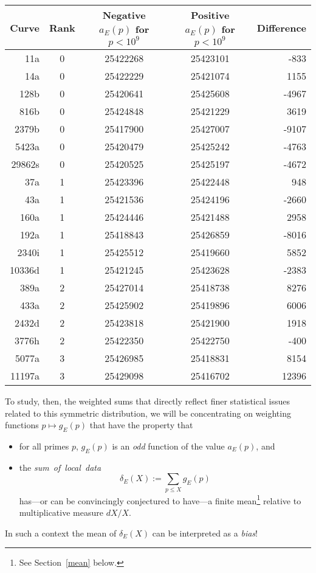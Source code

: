 \documentclass[11pt]{article}
\theoremstyle{plain}
\theoremstyle{definition}
\numberwithin{equation}{section}
\numberwithin{figure}{section}
\numberwithin{table}{section}
\begin{document}
\begin{itemize}
\begin{center}
\begin{tabular} {r | c | c | c | r}\hline
Curve & Rank & Negative $a_E(p)$ for $p<10^9$ & Positive $a_E(p)$ for $p<10^9$ & Difference\\ \hline\hline
11a    & 0      & 25422268       & 25423101     &   -833 \\ \hline
14a    & 0      & 25422229       & 25421074     &   1155 \\ \hline
128b   & 0      & 25420641       & 25425608     &   -4967 \\ \hline
816b   & 0      & 25424848       & 25421229     &   3619 \\ \hline
2379b  & 0      & 25417900       & 25427007     &   -9107 \\ \hline
5423a  & 0      & 25420479       & 25425242     &   -4763 \\ \hline
29862s & 0      & 25420525       & 25425197     &   -4672 \\ \hline
37a    & 1      & 25423396       & 25422448     &   948 \\ \hline
43a    & 1      & 25421536       & 25424196     &   -2660 \\ \hline
160a   & 1      & 25424446       & 25421488     &   2958 \\ \hline
192a   & 1      & 25418843       & 25426859     &   -8016 \\ \hline
2340i  & 1      & 25425512       & 25419660     &   5852 \\ \hline
10336d & 1      & 25421245       & 25423628     &   -2383 \\ \hline
389a   & 2      & 25427014       & 25418738     &   8276 \\ \hline
433a   & 2      & 25425902       & 25419896     &   6006 \\ \hline
2432d  & 2      & 25423818       & 25421900     &   1918 \\ \hline
3776h  & 2      & 25422350       & 25422750     &   -400 \\ \hline
5077a  & 3      & 25426985       & 25418831     &   8154 \\ \hline
11197a & 3      & 25429098       & 25416702     &   12396 \\ \hline
\end{tabular}
\end{center}

\vskip20pt
  To study, then, the weighted sums that directly reflect finer statistical issues related to this symmetric distribution, we will be concentrating on weighting functions $p \mapsto g_E(p)$ that have the property that \begin{itemize} \item for all primes $p$, $g_E(p)$ is an {\it odd} function of the value  $a_E(p)$, and \item the {\it sum\ of\ local\ data}  $$\delta_E(X):=\sum_{p\le X}g_E(p)$$ has---or can be convincingly conjectured to have---a finite mean{\footnote{ See Section~\ref{mean} below.}} relative to multiplicative measure $dX/X$.\end{itemize}  In such a context  the mean of $\delta_E(X)$ can be interpreted as a {\it bias}!



\end{itemize}
\end{document}
